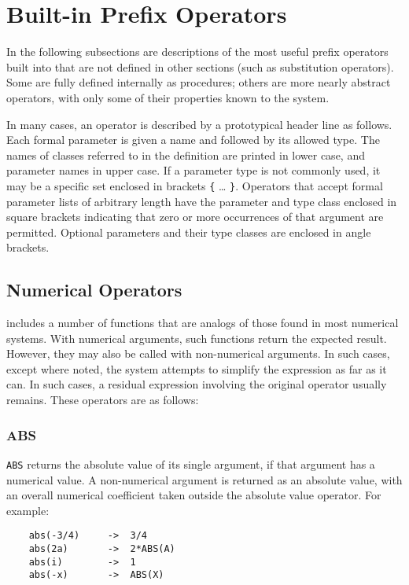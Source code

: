 \chapter{Built-in Prefix Operators}
In the following subsections are descriptions of the most useful prefix
operators built into {\REDUCE} that are not defined in other sections (such
as substitution operators). Some are fully defined internally as
procedures; others are more nearly abstract operators, with only some of
their properties known to the system.

In many cases, an operator is described by a prototypical header line as
follows. Each formal parameter is given a name and followed by its allowed
type. The names of classes referred to in the definition are printed in
lower case, and parameter names in upper case. If a parameter type is not
commonly used, it may be a specific set enclosed in brackets {\tt \{} \ldots
{\tt \}}.
Operators that accept formal parameter lists of arbitrary length have the
parameter and type class enclosed in square brackets indicating that zero
or more occurrences of that argument are permitted. Optional parameters
and their type classes are enclosed in angle brackets.

\section{Numerical Operators}
{\REDUCE} includes a number of functions that are analogs of those found
in most numerical systems.  With numerical arguments, such functions
return the expected result.  However, they may also be called with
non-numerical arguments.  In such cases, except where noted, the system
attempts to simplify the expression as far as it can.  In such cases, a
residual expression involving the original operator usually remains.
These operators are as follows:

\subsection{ABS}
{\tt ABS} returns the absolute value
of its single argument, if that argument has a numerical value.
A non-numerical argument is returned as an absolute value, with an overall
numerical coefficient taken outside the absolute value operator. For example:
\begin{verbatim}
	abs(-3/4)     ->  3/4
	abs(2a)       ->  2*ABS(A)
	abs(i)        ->  1
	abs(-x)       ->  ABS(X)
\end{verbatim}

